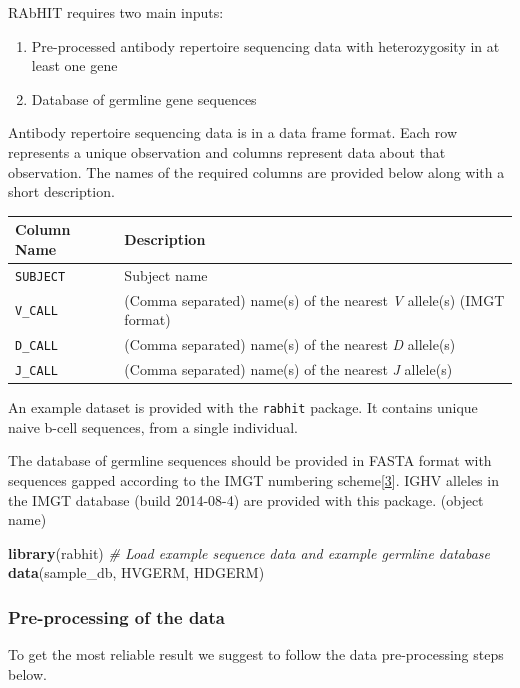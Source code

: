 \documentclass[11pt,]{article}
\newenvironment{Shaded}{}{}
\newcommand{\KeywordTok}[1]{\textcolor[rgb]{0.00,0.44,0.13}{\textbf{#1}}}
\newcommand{\CommentTok}[1]{\textcolor[rgb]{0.38,0.63,0.69}{\textit{#1}}}
\newcommand{\NormalTok}[1]{#1}
\providecommand{\tightlist}{%
  \setlength{\itemsep}{0pt}\setlength{\parskip}{0pt}}
\begin{document}
RAbHIT requires two main inputs:

\begin{enumerate}
\def\labelenumi{\arabic{enumi}.}
\tightlist
\item
  Pre-processed antibody repertoire sequencing data with heterozygosity
  in at least one gene
\item
  Database of germline gene sequences
\end{enumerate}

Antibody repertoire sequencing data is in a data frame format. Each row
represents a unique observation and columns represent data about that
observation. The names of the required columns are provided below along
with a short description.

\begin{longtable}[]{@{}ll@{}}
\toprule
Column Name & Description\tabularnewline
\midrule
\endhead
\texttt{SUBJECT} & Subject name\tabularnewline
\texttt{V\_CALL} & (Comma separated) name(s) of the nearest \emph{V}
allele(s) (IMGT format)\tabularnewline
\texttt{D\_CALL} & (Comma separated) name(s) of the nearest \emph{D}
allele(s)\tabularnewline
\texttt{J\_CALL} & (Comma separated) name(s) of the nearest \emph{J}
allele(s)\tabularnewline
\bottomrule
\end{longtable}

An example dataset is provided with the \texttt{rabhit} package. It
contains unique naive b-cell sequences, from a single individual.

The database of germline sequences should be provided in FASTA format
with sequences gapped according to the IMGT numbering
scheme{[}\protect\hyperlink{ref-lefranc2003imgt}{3}{]}. IGHV alleles in
the IMGT database (build 2014-08-4) are provided with this package.
(object name)

\begin{Shaded}
\begin{Highlighting}[]
\KeywordTok{library}\NormalTok{(rabhit)}
\CommentTok{# Load example sequence data and example germline database}
\KeywordTok{data}\NormalTok{(sample_db, HVGERM, HDGERM)}
\end{Highlighting}
\end{Shaded}

\subsubsection{Pre-processing of the
data}\label{pre-processing-of-the-data}

To get the most reliable result we suggest to follow the data
pre-processing steps below.
\end{document}

